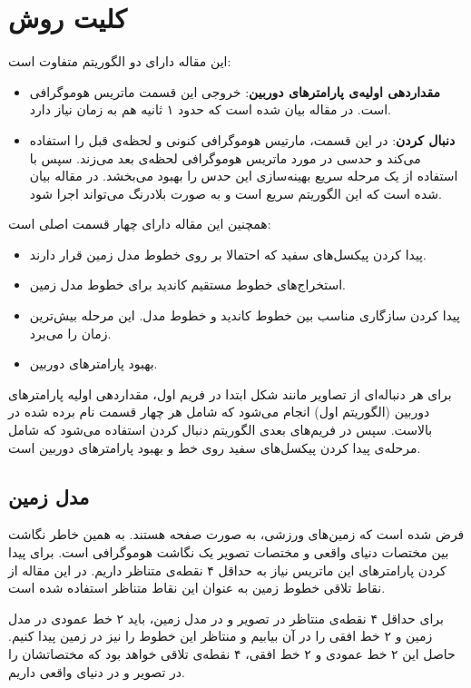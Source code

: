\documentclass{report}
\begin{document}
\section{کلیت روش}
این مقاله دارای دو الگوریتم متفاوت است:
\begin{itemize}
\item
\textbf{مقداردهی اولیه‌ی پارامترهای دوربین}: خروجی این قسمت ماتریس هوموگرافی است. در مقاله بیان شده است که حدود ۱ ثانیه هم به زمان نیاز دارد.
\item
\textbf{دنبال کردن}: در این قسمت، مارتیس هوموگرافی کنونی و لحظه‌ی قبل را استفاده می‌کند و حدسی در مورد ماتریس هوموگرافی لحظه‌ی بعد می‌زند. سپس با استفاده از یک مرحله سریع بهینه‌سازی این حدس را بهبود می‌بخشد. در مقاله بیان شده است که این الگوریتم سریع است و به صورت بلادرنگ می‌تواند اجرا شود.
\end{itemize}
همچنین این مقاله دارای چهار قسمت اصلی است:
\begin{itemize}
\item
پیدا کردن پیکسل‌های سفید که احتمالا بر روی خطوط مدل زمین قرار دارند.
\item
استخراج‌های خطوط مستقیم کاندید برای خطوط مدل زمین.
\item
پیدا کردن سازگاری مناسب بین خطوط کاندید و خطوط مدل. این مرحله بیش‌ترین زمان را می‌برد.
\item
بهبود پارامترهای دوربین.
\end{itemize}

برای هر دنباله‌ای از تصاویر مانند شکل  ابتدا در فریم اول، مقداردهی اولیه پارامترهای دوربین (الگوریتم اول) انجام می‌شود که شامل هر چهار قسمت نام برده شده در بالاست. سپس در فریم‌های بعدی الگوریتم دنبال کردن استفاده می‌شود که شامل مرحله‌ی پیدا کردن پیکسل‌های سفید روی خط و بهبود پارامترهای دوربین است.

\subsection{مدل زمین}
فرض شده است که زمین‌های ورزشی، به صورت صفحه هستند. به همین خاطر نگاشت بین مختصات دنیای واقعی و مختصات تصویر یک نگاشت هوموگرافی است. برای پیدا کردن پارامترهای این ماتریس نیاز به حداقل ۴ نقطه‌ی متناظر داریم. در این مقاله از نقاط تلاقی خطوط زمین به عنوان این نقاط متناظر استفاده شده است.

برای حداقل ۴ نقطه‌ی منتاظر در تصویر و در مدل زمین، باید ۲ خط عمودی در مدل زمین و ۲ خط افقی را در آن بیابیم و منتاظر این خطوط را نیز در زمین پیدا کنیم. حاصل این ۲ خط عمودی و ۲ خط افقی، ۴ نقطه‌ی تلاقی خواهد بود که مختصاتشان را در تصویر و در دنیای واقعی داریم.

\begin{latin}
{}

\end{latin}
\end{document}
